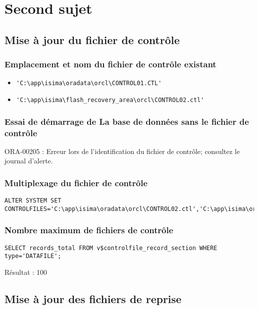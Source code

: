 \section{Second sujet}
\subsection{Mise à jour du fichier de contrôle}

\subsubsection{Emplacement et nom du fichier de contrôle existant}

\begin{itemize}
	\item \verb|'C:\app\isima\oradata\orcl\CONTROL01.CTL'|
	\item \verb|'C:\app\isima\flash_recovery_area\orcl\CONTROL02.ctl'|
\end{itemize}

\subsubsection{Essai de démarrage de La base de données sans le fichier de contrôle}

ORA-00205 : Erreur lors de l'identification du fichier de contrôle; consultez le journal d'alerte.

\subsubsection{Multiplexage du fichier de contrôle}

\begin{verbatim}
ALTER SYSTEM SET CONTROLFILES='C:\app\isima\oradata\orcl\CONTROL02.ctl','C:\app\isima\oradata\orcl\DISK2\CTRL02Test.ctl';
\end{verbatim}

\subsubsection{Nombre maximum de fichiers de contrôle}

\begin{verbatim}
SELECT records_total FROM v$controlfile_record_section WHERE type='DATAFILE';
\end{verbatim}

Résultat : 100

\subsection{Mise à jour des fichiers de reprise}
